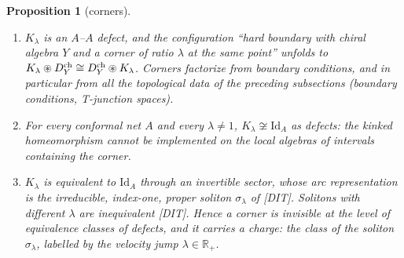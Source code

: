 \documentclass[11pt]{article}
\newtheorem{proposition}[theorem]{Proposition}
\theoremstyle{definition}
\theoremstyle{remark}
\newcommand{\cfus}{\circledast}
\newcommand{\Id}{\mathrm{Id}}
\begin{document}
\begin{proposition}[corners]\label{prop:corner}
\begin{enumerate}[nosep,label=(\alph*)]
\item $K_\lambda$ is an $A$--$A$ defect, and the configuration ``hard boundary with chiral algebra $Y$ and a corner of ratio $\lambda$ at the same point'' unfolds to $K_\lambda\cfus D^{\rm ch}_Y\cong D^{\rm ch}_{Y}\cfus K_\lambda$. Corners factorize from boundary conditions, and in particular from all the topological data of the preceding subsections (boundary conditions, T-junction spaces).
\item For every conformal net $A$ and every $\lambda\ne1$, $K_\lambda\not\cong\Id_A$ as defects: the kinked homeomorphism cannot be implemented on the local algebras of intervals containing the corner.
\item $K_\lambda$ is equivalent to $\Id_A$ through an invertible sector, whose arc representation is the irreducible, index-one, proper soliton $\sigma_\lambda$ of [DIT]. Solitons with different $\lambda$ are inequivalent [DIT]. Hence a corner is invisible at the level of equivalence classes of defects, and it carries a charge: the class of the soliton $\sigma_\lambda$, labelled by the velocity jump $\lambda\in\mathbb R_+$.
\end{enumerate}
\end{proposition}
\end{document}
